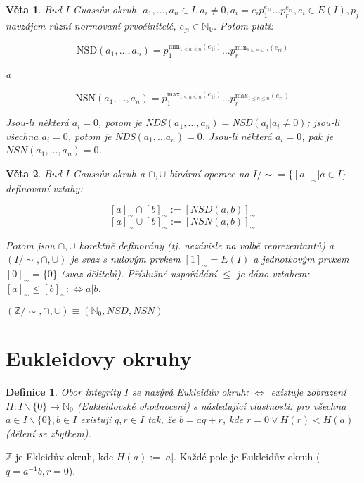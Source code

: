 \documentclass[a4paper, 11pt]{report}
\newtheorem{mydef}{Definice}[chapter]
\newtheorem{veta}{Věta}[chapter]
\begin{document}
\begin{veta}
Buď $I$ Guassův okruh, $a_1, \dots, a_n \in I, a_i \not= 0, a_i = e_i p_1^{e_{1i}} \dots p_r^{e_{ri}}, e_i \in E(I), p_j$ navzájem různí normovaní prvočinitelé, $e_{ji} \in \mathbb{N_0}$. Potom platí:

$$ \text{NSD}(a_1, \dots, a_n) = p_1^{\text{min}_{1 \leq n \leq n}(e_{1i})} \dots p_r^{\text{min}_{1 \leq n \leq n}(e_{ri})}$$

a

$$ \text{NSN}(a_1, \dots, a_n) = p_1^{\text{max}_{1 \leq n \leq n}(e_{1i})} \dots p_r^{\text{max}_{1 \leq n \leq n}(e_{ri})}$$

Jsou-li některá $a_i = 0$, potom je NDS$(a_1, \dots, a_n) = $NSD$(a_i|a_i \not= 0)$; jsou-li všechna $a_i = 0$, potom je NDS$(a_1, \dots a_n) = 0$. Jsou-li některá $a_i = 0$, pak je $NSN(a_1, \dots, a_n) = 0$.
\end{veta}

\begin{veta}
Buď $I$ Gaussův okruh a $\cap, \cup$ binární operace na $I / \sim= \{[a]_\sim | a \in I\}$ definovaní vztahy:

$$[a]_\sim \cap [b]_\sim := [NSD(a, b)]_\sim $$
$$[a]_\sim \cup [b]_\sim := [NSN(a, b)]_\sim $$

Potom jsou $\cap, \cup$ korektně definovány (tj. nezávisle na volbě reprezentantů) a $(I / \sim, \cap, \cup)$ je svaz s nulovým prvkem $[1]_\sim = E(I)$ a jednotkovým prvkem $[0]_\sim = \{0\}$ (svaz dělitelů). Příslušné uspořádání $\leq$ je dáno vztahem: $[a]_\sim \leq [b]_\sim : \Leftrightarrow a|b$.
\end{veta}

$(\mathbb{Z}/ \sim, \cap, \cup) \equiv (\mathbb{N}_0, NSD, NSN)$

\section{Eukleidovy okruhy}
\begin{mydef}
Obor integrity $I$ se nazývá Eukleidův okruh: $\Leftrightarrow$ existuje zobrazení $H: I \backslash \{0\} \to \mathbb{N}_0$ (Eukleidovské ohodnocení) s následující vlastností: pro všechna $a \in I \backslash \{0\}, b \in I$ existují $q, r \in I$ tak, že $b=aq + r$, kde $r = 0 \lor H(r) < H(a)$ (dělení se zbytkem).
\end{mydef}

$\mathbb{Z}$ je Ekleidův okruh, kde $H(a) := |a|$. Každé pole je Eukleidův okruh ($q = a^{-1}b, r = 0$).
\end{document}
